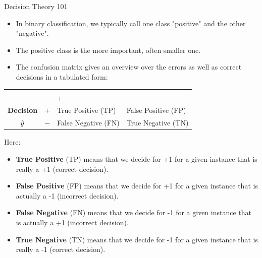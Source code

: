 \begin{vbframe}{Decision Theory 101}
	\scriptsize{
		\begin{itemize}
%			
			\item In binary classification, we typically call one class "positive" and the 
			other "negative".
%			
			\item The positive class is the more important, often smaller one.
%			
			\item The confusion matrix gives an overview over the errors as well as correct decisions in a tabulated form:
%
		\end{itemize}
		
		\begin{center}
			\footnotesize
			\begin{tabular}{cc|>{\centering\arraybackslash}p{7em}>{\centering\arraybackslash}p{8em}}
				& & \multicolumn{2}{c}{\bfseries True Class $y$} \\
				& & $+$ & $-$ \\
				\hline
				\bfseries Decision     & $+$ & True Positive (TP)  & False Positive (FP) \\
				$\hat{y}$ & $-$ & False Negative (FN) & True Negative (TN) \\
			\end{tabular}
		\end{center}
		Here:
		\begin{itemize}
			\item \textbf{True Positive} (TP) means that we decide for +1 for a given instance 
			that is really a +1 (correct decision).
			 \item \textbf{False Positive} (FP) means that we decide for +1 for a given instance 
			 that is actually a -1 (incorrect decision). 
			\item \textbf{False Negative} (FN) means that we decide for -1 for a given instance 
			that is actually a +1 (incorrect decision). 
			 \item \textbf{True Negative} (TN) means that we decide for -1 for a given instance 
			 that is really a -1 (correct decision).
		\end{itemize}
		
	}
\end{vbframe}



